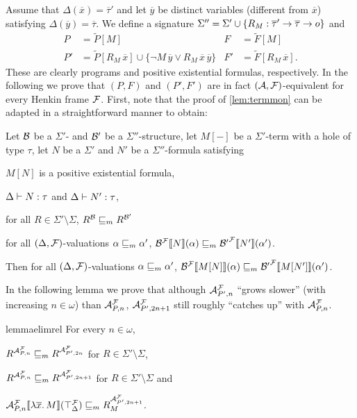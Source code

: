 \documentclass[a4paper,twoside,notitlepage,openright,11pt]{report}
\begin{document}
Assume that $\Delta(\overline x)=\overline\tau'$ and let $\overline y$ be distinct variables (different from $\overline x$) satisfying $\Delta(\overline y)=\overline\tau$. We define a signature $\Sigma''=\Sigma'\cup\{R_M:\overline\tau'\to\overline\tau\to o\}$ and
\begin{align*}
  P&=\widetilde P[M]&F&=\widetilde F[M]\\
  P'&=\widetilde P[R_M\,\overline x]\cup\{\neg M\,\overline y\lor R_M\,\overline x\,\overline y\}&F'&=\widetilde F[R_M\,\overline x].
\end{align*}
These are clearly programs and positive existential formulas, respectively.
In the following we prove that $(P,F)$ and $(P',F')$ are in fact $(\mathcal A,\mathcal F)$-equivalent for every Henkin frame $\mathcal F$. First, note that the proof of \cref{lem:termmon} can be adapted in a straightforward manner to obtain:
\begin{lemma}
  \label{lem:termmonhole}
  Let $\mathcal B$ be a $\Sigma'$- and $\mathcal B'$ be a $\Sigma''$-structure, let $M[-]$ be a $\Sigma'$-term with a hole of type $\tau$, let $N$ be a $\Sigma'$ and $N'$ be a $\Sigma''$-formula satisfying
  \begin{thmlist}
  \item $M[N]$ is a positive existential formula,
  \item $\Delta\vdash N:\tau$ and $\Delta\vdash N':\tau$,
  \item for all $R\in\Sigma'\setminus\Sigma$, $R^\mathcal B\sqsubseteq_m R^{\mathcal B'}$
  \item for all $(\Delta,\mathcal F)$-valuations $\alpha\sqsubseteq_m\alpha'$, ${\mathcal B}^\mathcal F\llbracket N\rrbracket(\alpha)\sqsubseteq_m{\mathcal B'}^\mathcal F\llbracket N'\rrbracket(\alpha')$.
  \end{thmlist}
  Then for all $(\Delta,\mathcal F)$-valuations $\alpha\sqsubseteq_m\alpha'$, ${\mathcal B}^\mathcal F\llbracket M[N]\rrbracket(\alpha)\sqsubseteq_m{\mathcal B'}^\mathcal F\llbracket M[N']\rrbracket(\alpha')$.
\end{lemma}
In the following lemma we prove that although $\mathcal A^\mathcal F_{P',n}$ ``grows slower'' (with increasing $n\in\omega$) than $\mathcal A^\mathcal F_{P,n}$, $\mathcal A^\mathcal F_{P',2n+1}$ still roughly ``catches up'' with $\mathcal A^\mathcal F_{P,n}$.
\begin{restatable}{lemma}{elimrel}
  \label{lem:elimrel}
  For every $n\in\omega$, 
  \begin{thmlist}
  \item $R^{\mathcal A^\mathcal F_{P,n}}\sqsubseteq_m R^{\mathcal A^\mathcal F_{P',2n}}$ for $R\in\Sigma'\setminus\Sigma$,
  \item $R^{\mathcal A^\mathcal F_{P,n}}\sqsubseteq_m R^{\mathcal A^\mathcal F_{P',2n+1}}$ for $R\in\Sigma'\setminus\Sigma$ and
  \item ${\mathcal A^\mathcal F_{P,n}}\llbracket\lambda\overline x\ldotp M\rrbracket(\top_\Delta^\mathcal F)\sqsubseteq_m R_M^{\mathcal A^\mathcal F_{P',2n+1}}$.
  \end{thmlist}
\end{restatable}
\end{document}
